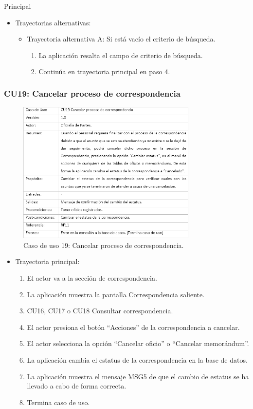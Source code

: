 \begin{UCtrayectoria}{Principal}
\begin{itemize}
	\item Trayectorias alternativas:
	\begin{itemize}
		\item Trayectoria alternativa A: Si está vacío el criterio de búsqueda.
			\begin{enumerate}
				\item La aplicación resalta el campo de criterio de búsqueda.
				\item Continúa en trayectoria principal en paso 4.
			\end{enumerate}
	\end{itemize}
\end{itemize}

\newpage
\subsubsection{CU19: Cancelar proceso de correspondencia}
\begin{figure}[htbp!]
		\centering
			\includegraphics[width=0.8\textwidth]{images/CU/CU19}
		\caption{Caso de uso 19: Cancelar proceso de correspondencia.}
		\label{Tabla}
	\end{figure}
	
\begin{itemize}
	\item Trayectoria principal:
	\begin{enumerate}
		\item El actor va a la sección de correspondencia.
		\item	La aplicación muestra la pantalla  Correspondencia saliente.
		\item	CU16, CU17 o CU18 Consultar correspondencia.
		\item	El actor presiona el botón “Acciones” de la correspondencia a cancelar.
		\item	El actor selecciona la opción “Cancelar oficio” o “Cancelar memorándum”.
		\item	La aplicación cambia el estatus de la correspondencia en la base de datos.
		\item	La aplicación muestra el mensaje MSG5 de que el cambio de estatus se ha llevado a cabo de forma correcta.
\item	Termina caso de uso.


\end{enumerate}
\end{itemize}
\end{UCtrayectoria}
